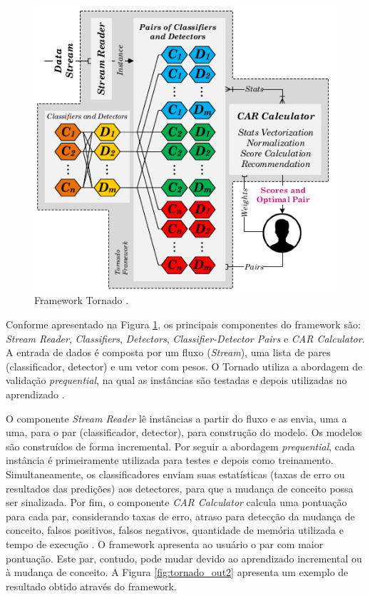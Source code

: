 \documentclass[qual, classic, a4paper]{ufbathesis}
\begin{document}
\begin{figure}[H]
\begin{center}
    \includegraphics[scale=0.75]{imagens/tornado.png}
    \caption{Framework Tornado \cite{Pesaranghader:Tornado}.}
    \label{fig:tornado}
\end{center}
\end{figure}

Conforme apresentado na Figura \ref{fig:tornado}, os principais componentes do framework são: 
\textit{Stream Reader}, \textit{Classifiers}, \textit{Detectors}, \textit{Classifier-Detector Pairs} e \textit{CAR Calculator}.
A entrada de dados é composta por um fluxo (\textit{Stream}), uma lista de pares (classificador, detector) e um vetor com pesos.
O Tornado utiliza a abordagem de validação \textit{prequential}, na qual as instâncias são testadas e depois utilizadas no aprendizado \cite{Gama:2014:SCD:2597757.2523813}.

O componente \textit{Stream Reader} lê instâncias a partir do fluxo e as envia, uma a uma, para o par (classificador, detector), para construção do modelo.
Os modelos são construídos de forma incremental. Por seguir a abordagem \textit{prequential}, cada instância é primeiramente utilizada para testes e depois como treinamento.
Simultaneamente, os classificadores enviam suas estatísticas (taxas de erro ou resultados das predições) aos detectores, para que a mudança de conceito possa ser sinalizada.
Por fim, o componente \textit{CAR Calculator} calcula uma pontuação para cada par, considerando taxas de erro, atraso para detecção da mudança de conceito, falsos positivos, falsos negativos, quantidade de memória utilizada e tempo de execução \cite{Pesaranghader:Tornado}.
O framework apresenta ao usuário o par com maior pontuação. Este par, contudo, pode mudar devido ao aprendizado incremental ou à mudança de conceito.
A Figura \ref{fig:tornado_out2} apresenta um exemplo de resultado obtido através do framework.
\end{document}
